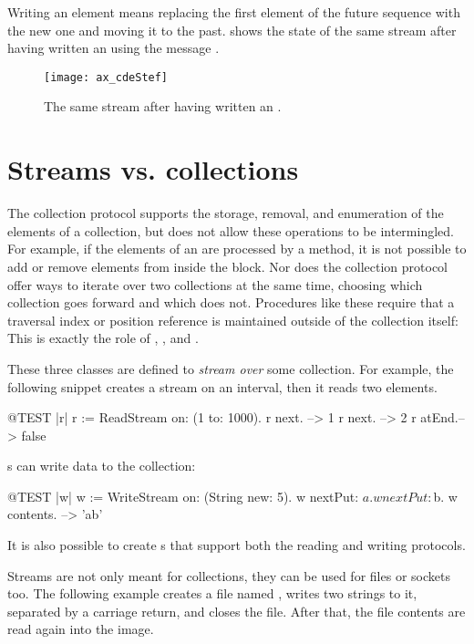 \documentclass[a4paper,10pt,twoside]{book}
\begin{document}
Writing an element means replacing the first element of the future sequence with the new one and moving it to the past.
 shows the state of the same stream after having written an  using the message  .

\begin{figure}[h!t]
\centerline{\texttt{[image: ax\_cdeStef]}}
\caption{The same stream after having written an .}
\label{fig:ax_cde}
\vspace{.2in}
\end{figure}

\section{Streams vs. collections}

The collection protocol supports the storage, removal, and enumeration of the elements of a collection, but does not allow these operations
to be intermingled.
For example, if the elements of an  are processed by a  method, it is not
possible to add or remove elements from inside the  block.
Nor does the collection protocol offer ways to iterate over two collections at the same time, choosing which collection goes forward
and which does not.
Procedures like these require that a traversal index or position reference is maintained outside of the collection itself:
This is exactly the role of , , and .

These three classes are defined to \emph{stream over} some collection.
For example, the following snippet creates a stream on an interval, then it reads two elements.
\begin{code}{@TEST |r|}
r := ReadStream on: (1 to: 1000).
r next.   --> 1
r next.   --> 2
r atEnd.--> false
\end{code}

s can write data to the collection:
\begin{code}{@TEST |w|}
w := WriteStream on: (String new: 5).
w nextPut: $a.
w nextPut: $b.
w contents. -->  'ab'
\end{code}

It is also possible to create s that support both the reading and writing protocols.

Streams are not only meant for collections, they can be used for files or sockets too.
The following example creates a file named , writes two strings to it, separated by a carriage return, and closes the file.
After that, the file contents are read again into the image.
\end{document}
